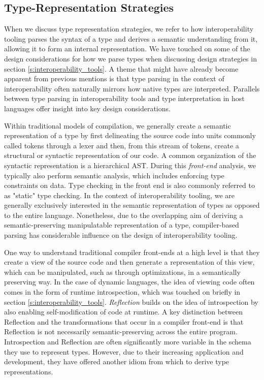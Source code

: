 \subsection{Type-Representation Strategies}\label{s:type_interpretation}

When we discuss type representation strategies, we refer to how interoperability tooling parses the syntax of a type and derives a semantic understanding from it, allowing it to form an internal representation. We have touched on some of the design considerations for how we parse types when discussing design strategies in section \ref{s:interoperability_tools}. A theme that might have already become apparent from previous mentions is that type parsing in the context of interoperability often naturally mirrors how native types are interpreted. Parallels between type parsing in interoperability tools and type interpretation in host languages offer insight into key design considerations.

Within traditional models of compilation, we generally create a semantic representation of a type by first delineating the source code into units commonly called tokens through a lexer and then, from this stream of tokens, create a structural or syntactic representation of our code. A common organization of the syntactic representation is a hierarchical AST. During this \textit{front-end} analysis, we typically also perform semantic analysis, which includes enforcing type constraints on data. Type checking in the front end is also commonly referred to as "static" type checking. In the context of interoperability tooling, we are generally exclusively interested in the semantic representation of types as opposed to the entire language. Nonetheless, due to the overlapping aim of deriving a semantic-preserving manipulatable representation of a type, compiler-based parsing has considerable influence on the design of interoperability tooling.    

One way to understand traditional compiler front-ends at a high level is that they create a view of the source code and then generate a representation of this view, which can be manipulated, such as through optimizations, in a semantically preserving way. In the case of dynamic languages, the idea of viewing code often comes in the form of runtime introspection, which was touched on briefly in section \ref{s:interoperability_tools}. \textit{Reflection} builds on the idea of introspection by also enabling self-modification of code at runtime. A key distinction between Reflection and the transformations that occur in a compiler front-end is that Reflection is not necessarily semantic-preserving across the entire program. Introspection and Reflection are often significantly more variable in the schema they use to represent types. However, due to their increasing application and development, they have offered another idiom from which to derive type representations. 

